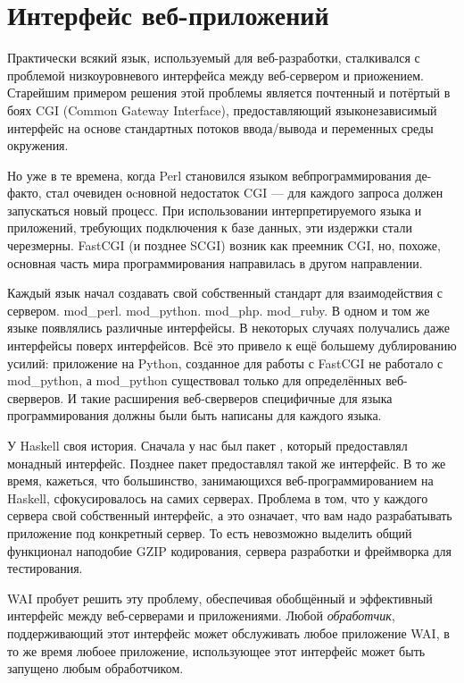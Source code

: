 \chapter{Интерфейс веб-приложений}\label{chap:web_application_interface}

Практически всякий язык, используемый для веб-разработки, сталкивался с проблемой
низкоуровневого интерфейса между веб-сервером и приожением. Старейшим примером
решения этой проблемы является почтенный и потёртый в боях CGI (Common Gateway Interface), 
предоставляющий языконезависимый интерфейс на основе стандартных потоков ввода/вывода и переменных среды окружения.

Но уже в те времена, когда Perl становился языком вебпрограммирования де-факто, стал очевиден оcновной недостаток CGI --- для каждого запроса должен запускаться новый процесс.
При использовании интерпретируемого языка и приложений, требующих подключения к базе
данных, эти издержки стали черезмерны. FastCGI (и позднее SCGI) возник как преемник
CGI, но, похоже, основная часть мира программирования направилась в другом направлении.

Каждый язык начал создавать свой собственный стандарт для взаимодействия с сервером.
mod\_perl. mod\_python. mod\_php. mod\_ruby. В одном и том же языке появлялись различные
интерфейсы. В некоторых случаях получались даже интерфейсы поверх интерфейсов.
Всё это привело к ещё большему дублированию усилий: приложение на Python, созданное
для работы с FastCGI не работало с mod\_python, а mod\_python существовал только для
определённых веб-сверверов. И такие расширения веб-сверверов специфичные для языка программирования должны были быть написаны для каждого языка.

У Haskell своя история. Сначала у нас был пакет , 
который предоставлял монадный интерфейс. Позднее пакет 
предоставлял такой же интерфейс. В то же время, кажеться, что большинство,
занимающихся веб-программированием на Haskell, сфокусировалось на самих серверах.
Проблема в том, что у каждого сервера свой собственный интерфейс, а это означает, что 
вам надо разрабатывать приложение под конкретный сервер. То есть невозможно выделить
общий функционал наподобие GZIP кодирования, сервера разработки и фреймворка для тестирования.

WAI пробует решить эту проблему, обеспечивая обобщённый и эффективный интерфейс между
веб-серверами и приложениями. Любой \emph{обработчик}, поддерживающий этот интерфейс может обслуживать
любое приложение WAI, в то же время любоее приложение, использующее этот интерфейс может быть запущено любым обработчиком.

